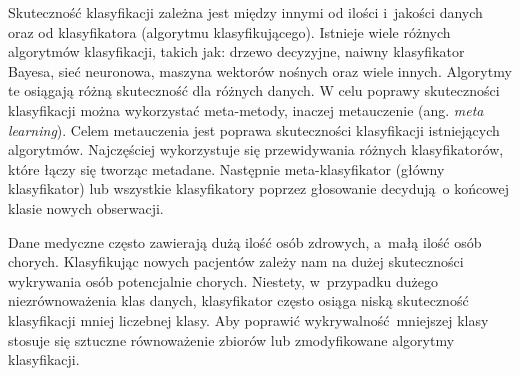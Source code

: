 Skuteczność klasyfikacji zależna jest między innymi od ilości i~jakości danych oraz od klasyfikatora (algorytmu klasyfikującego). Istnieje wiele różnych algorytmów klasyfikacji, takich jak: drzewo decyzyjne, naiwny klasyfikator Bayesa, sieć neuronowa, maszyna wektorów nośnych oraz wiele innych. Algorytmy te osiągają różną skuteczność dla różnych danych. W celu poprawy skuteczności klasyfikacji można wykorzystać meta-metody, inaczej metauczenie (ang. \textit{meta learning}). Celem metauczenia jest poprawa skuteczności klasyfikacji istniejących algorytmów. Najczęściej wykorzystuje się przewidywania różnych klasyfikatorów, które łączy się tworząc metadane. Następnie meta-klasyfikator (główny klasyfikator) lub wszystkie klasyfikatory poprzez głosowanie decydują o końcowej klasie nowych obserwacji. 	\par 
Dane medyczne często zawierają dużą ilość osób zdrowych, a~małą ilość osób chorych. Klasyfikując nowych pacjentów zależy nam na dużej skuteczności wykrywania osób potencjalnie chorych. Niestety, w~przypadku dużego niezrównoważenia klas danych, klasyfikator często osiąga niską skuteczność klasyfikacji mniej liczebnej klasy. Aby poprawić wykrywalność mniejszej klasy stosuje się sztuczne równoważenie zbiorów lub zmodyfikowane algorytmy klasyfikacji.